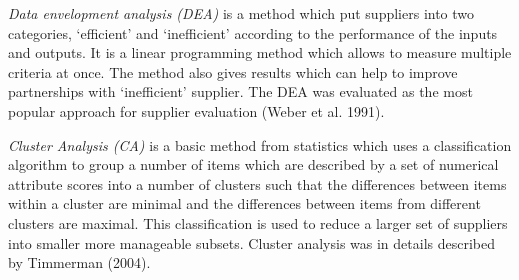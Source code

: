 \documentclass[oneside,12pt]{article}%
\begin{document}
\emph{Data envelopment analysis (DEA)} is a method which put suppliers into two categories, ‘efficient’ and ‘inefficient’ according to the performance of the inputs and outputs. It is a linear programming method which allows to measure multiple criteria at once. The method also gives results which can help to improve partnerships with ‘inefficient’ supplier. The DEA was evaluated as the most popular approach for supplier evaluation (Weber et al. 1991). \par

\emph{Cluster Analysis (CA)} is a basic method from statistics which uses a classification algorithm to group a number of items which are described by a set of numerical attribute scores into a number of clusters such that the differences between items within a cluster are minimal and the differences between items from different clusters are maximal. This classification is used to reduce a larger set of suppliers into smaller more manageable subsets. Cluster analysis was in details described by Timmerman (2004).
\end{document}
